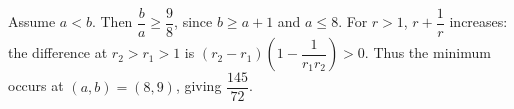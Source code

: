 Assume $a<b$. Then $\dfrac{b}{a}\ge\dfrac{9}{8}$, since $b\ge a+1$ and $a\le8$. For $r>1$, $r+\dfrac{1}{r}$ increases: the difference at $r_2>r_1>1$ is $(r_2-r_1)(1-\dfrac{1}{r_1r_2})>0$. Thus the minimum occurs at $(a,b)=(8,9)$, giving $\boxed{\dfrac{145}{72}}$.
